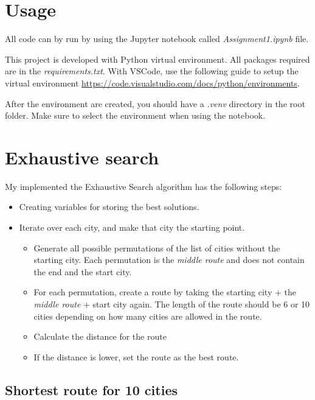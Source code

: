 \documentclass{article}
\begin{document}
    
    
    \section{Usage}

    All code can by run by using the Jupyter notebook called \textit{Assignment1.ipynb} file.

    This project is developed with Python virtual environment. 
    All packages required are in the \textit{requirements.txt}.
    With VSCode, use the following guide to setup the virtual environment \url{https://code.visualstudio.com/docs/python/environments}.

    After the environment are created, you should have a \textit{.venv} directory in the root folder. 
    Make sure to select the environment when using the notebook. 

    \newpage

    \section{Exhaustive search}

    My implemented the Exhaustive Search algorithm has the following steps: 

    \begin{itemize}
        \item Creating variables for storing the best solutions.
        \item Iterate over each city, and make that city the starting point. 
        \begin{itemize}
            \item Generate all possible permutations of the list of cities without the starting city. Each permutation is the \textit{middle route} and does not contain the end and the start city.
            \item For each permutation, create a route by taking the starting city + the \textit{middle route} + start city again. The length of the route should be 6 or 10 cities depending on how many cities are allowed in the route.
            \item Calculate the distance for the route
            \item If the distance is lower, set the route as the best route. 
        \end{itemize}
    \end{itemize}


    \subsection{Shortest route for 10 cities}
\end{document}
